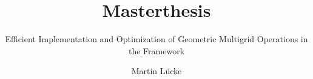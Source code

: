 \documentclass{beamer}
\author{Martin Lücke}
\title{Masterthesis}
\subtitle{Efficient Implementation and Optimization of Geometric Multigrid Operations in the
\Lift Framework}
\newcommand{\Lift}{\textsc{Lift}\xspace}
\begin{document}
\begin{frame}[plain]
  \maketitle
\end{frame}

%
%
%


%
%	

\end{document}
